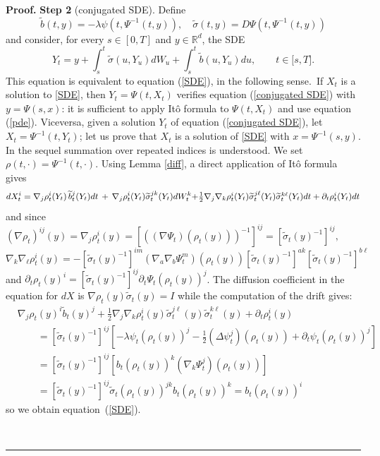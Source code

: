 \documentclass[a4paper,10pt]{article}
\newenvironment{proof}[1][Proof]{\textbf{#1.} }{\ \rule{0.5em}{0.5em}}
\begin{document}
\begin{proof}
\vskip 2mm \textbf{Step 2} (conjugated SDE). Define
\[
\widetilde{b}(t,y)=-\lambda\psi(t,\Psi^{-1}(t,y)),\quad\widetilde{\sigma
}(t,y)=D\Psi(t,\Psi^{-1}(t,y))
\]
and consider, for every $s\in\left[  0,T\right]  $ and
$y\in{\mathbb{R}}^{d}$,
the SDE%
\begin{equation}
Y_{t}=y+\int_{s}^{t}\tilde{\sigma}(u,Y_{u})dW_{u}+\int_{s}^{t}\widetilde
{b}(u,Y_{u})du,\qquad t\in\lbrack s,T]. \label{conjugated SDE}
\end{equation}
This equation is equivalent to equation (\ref{SDE}), in the
following sense.\ If $X_{t}$ is a solution to \eqref{SDE}, then
$Y_{t}=\Psi(t,X_{t})$ verifies equation (\ref{conjugated SDE})
with $y=\Psi(s,x)$: it is sufficient to apply It\^{o} formula to
$\Psi(t,X_{t})$ and use equation (\ref{pde}). Viceversa, given a
solution $Y_{t}$ of equation (\ref{conjugated SDE}), let
$X_{t}=\Psi^{-1}(t,Y_{t})$; let us prove that $X_{t}$ is a
solution of \eqref{SDE} with $x=\Psi^{-1}(s,y)$. In the sequel
summation over repeated indices is understood. We set
  $\rho(t,\cdot)=\Psi^{-1}(t,\cdot)$. Using Lemma \ref{diff},
   a direct application of It\^{o} formula gives
\[
dX_{t}^{i}=\nabla_{j}\rho_{t}^{i}(Y_{t})\,\widetilde{b}_{t}^{j}(Y_{t}%
)dt\,+\,\nabla_{j}\rho_{t}^{i}(Y_{t})\widetilde{\sigma}_{t}^{jk}(Y_{t}%
)dW_{t}^{k}
$$ $$+\frac{1}{2}\nabla_{j}\nabla_{k}\rho_{t}^{i}(Y_{t})\widetilde
{\sigma}_{t}^{j\ell}(Y_{t})\widetilde{\sigma}_{t}^{k\ell}(Y_{t})dt+\partial
_{t}\rho_{t}^{i}(Y_{t})dt
\]
and since $(\nabla\rho_{t})^{ij}(y)=\nabla_{j}\rho_{t}^{i}(y)=[((\nabla
\Psi_{t})(\rho_{t}(y)))^{-1}]^{ij}=[\tilde{\sigma}_{t}(y)^{-1}]^{ij},$
\[
\nabla_{k}\nabla_{\ell}\rho_{t}^{i}(y)=-[\tilde{\sigma}_{t}(y)^{-1}%
]^{im}(\nabla_{a}\nabla_{b}\Psi_{t}^{m})(\rho_{t}(y))[\tilde{\sigma}%
_{t}(y)^{-1}]^{ak}[\tilde{\sigma}_{t}(y)^{-1}]^{b\ell}%
\]
and $\partial_{t}\rho_{t}(y)^{i}=[\tilde{\sigma}_{t}(y)^{-1}]^{ij}\partial
_{t}\Psi_{t}(\rho_{t}(y))^{j}$. The diffusion coefficient in the equation for
$dX$ is $\nabla\rho_{t}(y)\widetilde{\sigma}_{t}(y)=I$ while the computation
of the drift gives:
\[%
\begin{split}
&  \nabla_{j}\rho_{t}(y)^{i}\tilde{b}_{t}(y)^{j}+\frac{1}{2}\nabla_{j}%
\nabla_{k}\rho_{t}^{i}(y)\widetilde{\sigma}_{t}^{j\ell}(y)\widetilde{\sigma
}_{t}^{k\ell}(y)+\partial_{t}\rho_{t}^{i}(y)\\
&  \qquad=[\tilde{\sigma}_{t}(y)^{-1}]^{ij}\left[  -\lambda\psi_{t}(\rho
_{t}(y))^{j}-\frac{1}{2}(\Delta\psi_{t}^{j})(\rho_{t}(y))+\partial_{t}\psi
_{t}(\rho_{t}(y))^{j}\right] \\
&  \qquad=[\tilde{\sigma}_{t}(y)^{-1}]^{ij}\left[  b_{t}(\rho_{t}%
(y))^{k}(\nabla_{k}\Psi_{t}^{j})(\rho_{t}(y))\right] \\
&  \qquad=[\tilde{\sigma}_{t}(y)^{-1}]^{ij}\tilde{\sigma}_{t}(\rho
_{t}(y))^{jk}b_{t}(\rho_{t}(y))^{k}=b_{t}(\rho_{t}(y))^{i}%
\end{split}
\]
so we obtain equation~(\ref{SDE}).


\end{proof}
\end{document}
